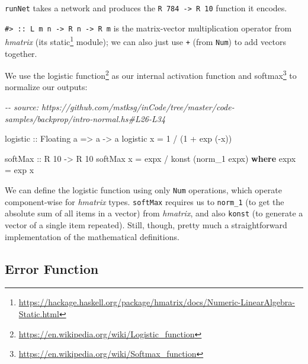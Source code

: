 \documentclass[]{article}
\newenvironment{Shaded}{}{}
\newcommand{\CommentTok}[1]{\textcolor[rgb]{0.38,0.63,0.69}{\textit{#1}}}
\newcommand{\DataTypeTok}[1]{\textcolor[rgb]{0.56,0.13,0.00}{#1}}
\newcommand{\DecValTok}[1]{\textcolor[rgb]{0.25,0.63,0.44}{#1}}
\newcommand{\FunctionTok}[1]{\textcolor[rgb]{0.02,0.16,0.49}{#1}}
\newcommand{\KeywordTok}[1]{\textcolor[rgb]{0.00,0.44,0.13}{\textbf{#1}}}
\newcommand{\NormalTok}[1]{#1}
\newcommand{\OperatorTok}[1]{\textcolor[rgb]{0.40,0.40,0.40}{#1}}
\newcommand{\OtherTok}[1]{\textcolor[rgb]{0.00,0.44,0.13}{#1}}
\renewcommand{\href}[2]{#2\footnote{\url{#1}}}
\begin{document}
\texttt{runNet} takes a network and produces the
\texttt{R\ 784\ -\textgreater{}\ R\ 10} function it encodes.

\texttt{\#\textgreater{}\ ::\ L\ m\ n\ -\textgreater{}\ R\ n\ -\textgreater{}\ R\ m}
is the matrix-vector multiplication operator from \emph{hmatrix} (its
\href{https://hackage.haskell.org/package/hmatrix/docs/Numeric-LinearAlgebra-Static.html}{static}
module); we can also just use \texttt{+} (from \texttt{Num}) to add vectors
together.

We use the \href{https://en.wikipedia.org/wiki/Logistic_function}{logistic
function} as our internal activation function and
\href{https://en.wikipedia.org/wiki/Softmax_function}{softmax} to normalize our
outputs:

\begin{Shaded}
\begin{Highlighting}[]
\CommentTok{{-}{-} source: https://github.com/mstksg/inCode/tree/master/code{-}samples/backprop/intro{-}normal.hs\#L26{-}L34}

\OtherTok{logistic ::} \DataTypeTok{Floating}\NormalTok{ a }\OtherTok{=\textgreater{}}\NormalTok{ a }\OtherTok{{-}\textgreater{}}\NormalTok{ a}
\NormalTok{logistic x }\OtherTok{=} \DecValTok{1} \OperatorTok{/}\NormalTok{ (}\DecValTok{1} \OperatorTok{+} \FunctionTok{exp}\NormalTok{ (}\OperatorTok{{-}}\NormalTok{x))}

\NormalTok{softMax}
\OtherTok{    ::} \DataTypeTok{R} \DecValTok{10}
    \OtherTok{{-}\textgreater{}} \DataTypeTok{R} \DecValTok{10}
\NormalTok{softMax x }\OtherTok{=}\NormalTok{ expx }\OperatorTok{/}\NormalTok{ konst (norm\_1 expx)}
  \KeywordTok{where}
\NormalTok{    expx }\OtherTok{=} \FunctionTok{exp}\NormalTok{ x}
\end{Highlighting}
\end{Shaded}

We can define the logistic function using only \texttt{Num} operations, which
operate component-wise for \emph{hmatrix} types. \texttt{softMax} requires us to
\texttt{norm\_1} (to get the absolute sum of all items in a vector) from
\emph{hmatrix}, and also \texttt{konst} (to generate a vector of a single item
repeated). Still, though, pretty much a straightforward implementation of the
mathematical definitions.

\subsection{Error Function}\label{error-function}
\end{document}
